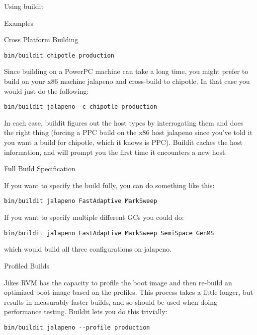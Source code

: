 \begin{section}{Using buildit}
\begin{subsection}{Examples}
\begin{subsubsection}{Cross Platform Building}
\begin{lstlisting}
bin/buildit chipotle production
\end{lstlisting}

Since building on a PowerPC machine can take a long time, you might prefer to build on your x86 machine jalapeno and cross-build to chipotle.  In that case you would just do the following: 

\begin{lstlisting}
bin/buildit jalapeno -c chipotle production
\end{lstlisting}

In each case, buildit figures out the host types by interrogating them and does the right thing (forcing a PPC build on the x86 host jalapeno since you've told it you want a build for chipotle, which it knows is PPC).  Buildit caches the host information, and will prompt you the first time it encounters a new host. 

\end{subsubsection}

\begin{subsubsection}{Full Build Specification}

If you want to specify the build fully, you can do something like this:

\begin{lstlisting}
bin/buildit jalapeno FastAdaptive MarkSweep
\end{lstlisting}

If you want to specify multiple different GCs you could do:

\begin{lstlisting}
bin/buildit jalapeno FastAdaptive MarkSweep SemiSpace GenMS
\end{lstlisting}

which would build all three configurations on jalapeno.
\end{subsubsection}

\begin{subsubsection}{Profiled Builds}

Jikes RVM has the capacity to profile the boot image and then re-build an optimized boot image based on the profiles.  This process takes a little longer, but results in measurably faster builds, and so should be used when doing performance testing.  Buildit lets you do this trivially:

\begin{lstlisting}
bin/buildit jalapeno --profile production
\end{lstlisting}


\end{subsubsection}
\end{subsection}
\end{section}
